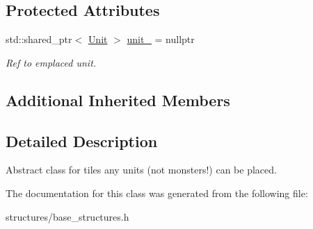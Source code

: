 \subsection*{Protected Attributes}
\begin{DoxyCompactItemize}
\item 
\mbox{\label{classbase__structures_1_1Placable_a2ff96a51bb8bce25aad6bed4fd7bbf22}} 
std\+::shared\+\_\+ptr$<$ \hyperlink{classbase__structures_1_1Unit}{Unit} $>$ \hyperlink{classbase__structures_1_1Placable_a2ff96a51bb8bce25aad6bed4fd7bbf22}{unit\+\_\+} = nullptr
\begin{DoxyCompactList}\small\item\em Ref to emplaced unit. \end{DoxyCompactList}\end{DoxyCompactItemize}
\subsection*{Additional Inherited Members}


\subsection{Detailed Description}
Abstract class for tiles any units (not monsters!) can be placed. 

The documentation for this class was generated from the following file\+:\begin{DoxyCompactItemize}
\item 
structures/base\+\_\+structures.\+h\end{DoxyCompactItemize}
